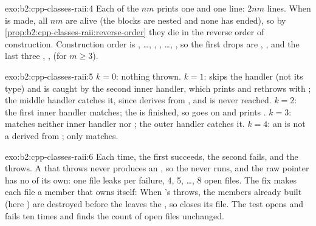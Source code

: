 \begin{solution}{exo:b2:cpp-classes-raii:4}
Each of the $nm$  prints one  and one  line: $2nm$ lines. When  is made, all
$nm$  are alive (the blocks are nested and none has ended), so by \cref{prop:b2:cpp-classes-raii:reverse-order}
they die in the reverse order of construction. Construction order is , \dots, , ,
\dots, , so the first drops are , ,  and the last three
, ,  (for $m \geq 3$).
\end{solution}

\begin{solution}{exo:b2:cpp-classes-raii:5}
$k = 0$: nothing thrown. $k = 1$:  skips the  handler (not its type) and is
caught by the second inner handler, which prints and rethrows with ; the middle handler catches it,
since  derives from , and  is never reached. $k = 2$: the
first inner handler matches; the  is finished, so  goes on and prints .
$k = 3$:  matches neither inner handler nor ; the outer
 handler catches it. $k = 4$: an  is not a  derived from ;
only  matches.
\end{solution}

\begin{solution}{exo:b2:cpp-classes-raii:6}
Each time, the first  succeeds, the second fails, and the  throws. A  that throws
never produces an , so the  never runs, and the raw pointer  has no  of its own:
one file leaks per failure, 4, 5, \dots, 8 open files. The fix makes each file a member that owns itself:
When 's  throws, the members already built (here ) are destroyed before the 
leaves the , so  closes its file. The test opens and fails ten times and finds the count of open
files unchanged.
\end{solution}

